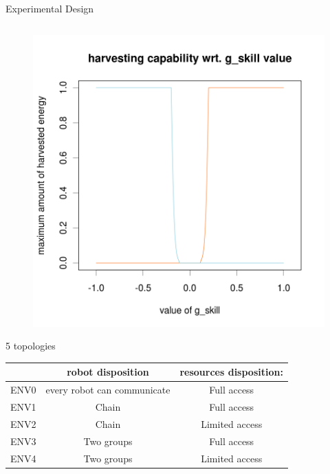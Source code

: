 \documentclass[8pt, handout=show,notes=show]{beamer}
\begin{document}
\begin{frame}{Experimental Design}
\begin{columns}
\end{columns}
\begin{figure}
\includegraphics[width=.45\textwidth]{../images/sparsityEffect/f_skill}
\end{figure}
\end{frame}
 


\begin{frame}{5 topologies}
\begin{table}[h]
\begin{tabular}{l|c|c|}
\small
&robot disposition& resources disposition: \\
\hline
ENV0 &every robot can communicate& Full access\\\hline
ENV1 &Chain & Full access\\\hline
ENV2 &Chain & Limited access \\\hline
ENV3&Two groups & Full access\\\hline
ENV4&Two groups & Limited access 
\end{tabular}
\end{table}
\end{frame}

\end{document}
